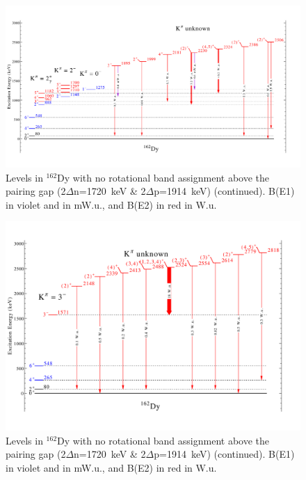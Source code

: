 \begin{landscape}
\begin{figure}[h!]
\begin{center}
\includegraphics[height=0.85\textheight]{162Dy_misc2.pdf}
\end{center}
\caption{Levels in $^{162}$Dy with no rotational band assignment above the pairing gap (2$\Delta$n=1720~keV \& 2$\Delta$p=1914~keV) (continued). B(E1) in violet and in mW.u., and B(E2) in red in W.u. \label{fig:162Dy_misc2}}
\end{figure}
\end{landscape}

\begin{landscape}
\begin{figure}[h!]
\begin{center}
\includegraphics[height=0.85\textheight]{162Dy_misc3.pdf}
\end{center}
\caption{Levels in $^{162}$Dy with no rotational band assignment above the pairing gap (2$\Delta$n=1720~keV \& 2$\Delta$p=1914~keV) (continued). B(E1) in violet and in mW.u., and B(E2) in red in W.u. \label{fig:162Dy_misc}}
\end{figure}
\end{landscape}


